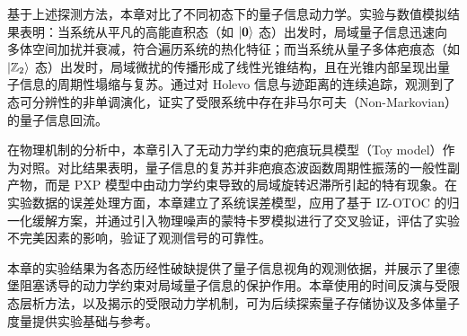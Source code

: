 \documentclass[../main.tex]{subfiles}
\begin{document}
基于上述探测方法，本章对比了不同初态下的量子信息动力学。实验与数值模拟结果表明：当系统从平凡的高能直积态（如 $\ket{\mathbf{0}}$ 态）出发时，局域量子信息迅速向多体空间加扰并衰减，符合遍历系统的热化特征；而当系统从量子多体疤痕态（如 $\ket{\mathbb{Z}_2}$ 态）出发时，局域微扰的传播形成了线性光锥结构，且在光锥内部呈现出量子信息的周期性塌缩与复苏。通过对 Holevo 信息与迹距离的连续追踪，观测到了态可分辨性的非单调演化，证实了受限系统中存在非马尔可夫（Non-Markovian）的量子信息回流。

在物理机制的分析中，本章引入了无动力学约束的疤痕玩具模型（Toy model）作为对照。对比结果表明，量子信息的复苏并非疤痕态波函数周期性振荡的一般性副产物，而是 PXP 模型中由动力学约束导致的局域旋转迟滞所引起的特有现象。在实验数据的误差处理方面，本章建立了系统误差模型，应用了基于 IZ-OTOC 的归一化缓解方案，并通过引入物理噪声的蒙特卡罗模拟进行了交叉验证，评估了实验不完美因素的影响，验证了观测信号的可靠性。

本章的实验结果为各态历经性破缺提供了量子信息视角的观测依据，并展示了里德堡阻塞诱导的动力学约束对局域量子信息的保护作用。本章使用的时间反演与受限态层析方法，以及揭示的受限动力学机制，可为后续探索量子存储协议及多体量子度量提供实验基础与参考。








\end{document}
